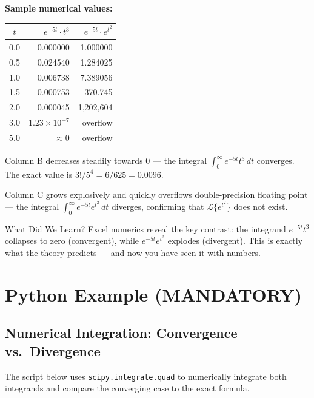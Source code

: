 \documentclass[12pt,a4paper]{article}
\begin{document}
\textbf{Sample numerical values:}

\begin{center}
\begin{tabular}{c r r}
\toprule
$t$ & $e^{-5t} \cdot t^3$ & $e^{-5t} \cdot e^{t^2}$ \\
\midrule
0.0 & 0.000000 & 1.000000 \\
0.5 & 0.024540 & 1.284025 \\
1.0 & 0.006738 & 7.389056 \\
1.5 & 0.000753 & 370.745 \\
2.0 & 0.000045 & 1,202,604 \\
3.0 & $1.23 \times 10^{-7}$ & \textrm{overflow} \\
5.0 & $\approx 0$ & \textrm{overflow} \\
\bottomrule
\end{tabular}
\end{center}

Column B decreases steadily towards 0 --- the integral $\int_0^\infty e^{-5t} t^3\, dt$ converges. The exact value is $3!/5^4 = 6/625 = 0.0096$.

Column C grows explosively and quickly overflows double-precision floating point --- the integral $\int_0^\infty e^{-5t} e^{t^2}\, dt$ diverges, confirming that $\mathcal{L}\{e^{t^2}\}$ does not exist.

\begin{learnbox}{What Did We Learn?}
Excel numerics reveal the key contrast: the integrand $e^{-5t} t^3$ collapses to zero (convergent), while $e^{-5t} e^{t^2}$ explodes (divergent). This is exactly what the theory predicts --- and now you have seen it with numbers.
\end{learnbox}

\section{Python Example (MANDATORY)}

\subsection{Numerical Integration: Convergence vs.\ Divergence}

The script below uses \texttt{scipy.integrate.quad} to numerically integrate both integrands and compare the converging case to the exact formula.
\end{document}

